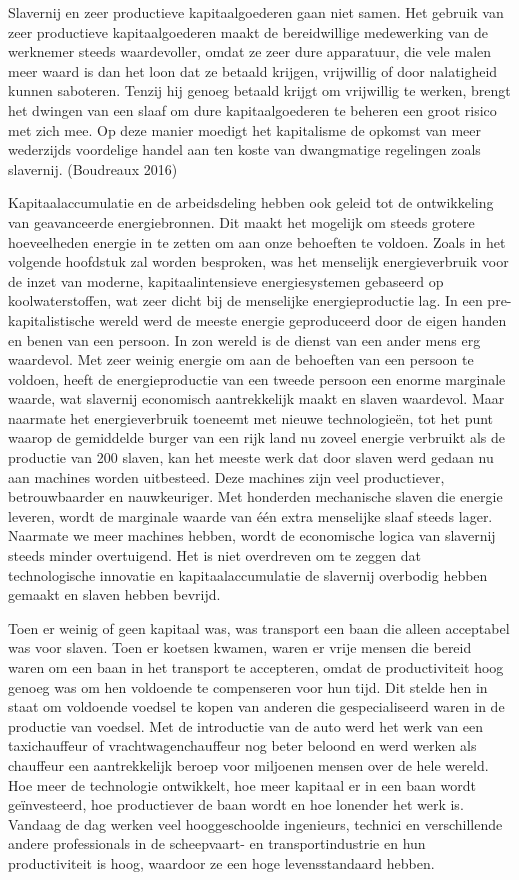 \documentclass[
  a5paper,
  smalldemyvopaper,11pt,twoside,onecolumn,openright,extrafontsizes,
hidelinks]{memoir}
\begin{document}
Slavernij en zeer productieve kapitaalgoederen gaan niet samen. Het
gebruik van zeer productieve kapitaalgoederen maakt de bereidwillige
medewerking van de werknemer steeds waardevoller, omdat ze zeer dure
apparatuur, die vele malen meer waard is dan het loon dat ze betaald
krijgen, vrijwillig of door nalatigheid kunnen saboteren. Tenzij hij
genoeg betaald krijgt om vrijwillig te werken, brengt het dwingen van
een slaaf om dure kapitaalgoederen te beheren een groot risico met zich
mee. Op deze manier moedigt het kapitalisme de opkomst van meer
wederzijds voordelige handel aan ten koste van dwangmatige regelingen
zoals slavernij. (Boudreaux 2016)

Kapitaalaccumulatie en de arbeidsdeling hebben ook geleid tot de
ontwikkeling van geavanceerde energiebronnen. Dit maakt het mogelijk om
steeds grotere hoeveelheden energie in te zetten om aan onze behoeften
te voldoen. Zoals in het volgende hoofdstuk zal worden besproken, was
het menselijk energieverbruik voor de inzet van moderne,
kapitaalintensieve energiesystemen gebaseerd op koolwaterstoffen, wat
zeer dicht bij de menselijke energieproductie lag. In een
pre-kapitalistische wereld werd de meeste energie geproduceerd door de
eigen handen en benen van een persoon. In zon wereld is de dienst van
een ander mens erg waardevol. Met zeer weinig energie om aan de
behoeften van een persoon te voldoen, heeft de energieproductie van een
tweede persoon een enorme marginale waarde, wat slavernij economisch
aantrekkelijk maakt en slaven waardevol. Maar naarmate het
energieverbruik toeneemt met nieuwe technologieën, tot het punt waarop
de gemiddelde burger van een rijk land nu zoveel energie verbruikt als
de productie van 200 slaven, kan het meeste werk dat door slaven werd
gedaan nu aan machines worden uitbesteed. Deze machines zijn veel
productiever, betrouwbaarder en nauwkeuriger. Met honderden mechanische
slaven die energie leveren, wordt de marginale waarde van één extra
menselijke slaaf steeds lager. Naarmate we meer machines hebben, wordt
de economische logica van slavernij steeds minder overtuigend. Het is
niet overdreven om te zeggen dat technologische innovatie en
kapitaalaccumulatie de slavernij overbodig hebben gemaakt en slaven
hebben bevrijd.

Toen er weinig of geen kapitaal was, was transport een baan die alleen
acceptabel was voor slaven. Toen er koetsen kwamen, waren er vrije
mensen die bereid waren om een baan in het transport te accepteren,
omdat de productiviteit hoog genoeg was om hen voldoende te compenseren
voor hun tijd. Dit stelde hen in staat om voldoende voedsel te kopen van
anderen die gespecialiseerd waren in de productie van voedsel. Met de
introductie van de auto werd het werk van een taxichauffeur of
vrachtwagenchauffeur nog beter beloond en werd werken als chauffeur een
aantrekkelijk beroep voor miljoenen mensen over de hele wereld. Hoe meer
de technologie ontwikkelt, hoe meer kapitaal er in een baan wordt
geïnvesteerd, hoe productiever de baan wordt en hoe lonender het werk
is. Vandaag de dag werken veel hooggeschoolde ingenieurs, technici en
verschillende andere professionals in de scheepvaart- en
transportindustrie en hun productiviteit is hoog, waardoor ze een hoge
levensstandaard hebben.
\end{document}
